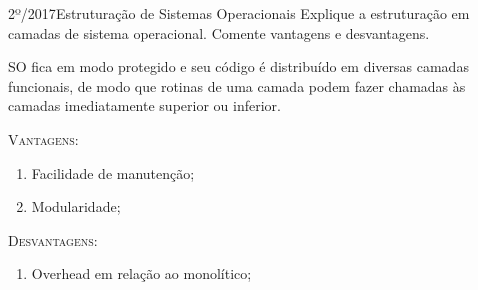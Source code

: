 \begin{exercicio}
  {2º/2017}{Estruturação de Sistemas Operacionais}
  {Explique a estruturação em camadas de sistema operacional. Comente vantagens e desvantagens.}

SO fica em modo protegido e seu código é distribuído em diversas camadas funcionais, de modo que rotinas de uma camada podem fazer chamadas às camadas imediatamente superior ou inferior.

 \textsc{Vantagens}:
  \begin{enumerate}
    \item Facilidade de manutenção;

    \item Modularidade;
  \end{enumerate}

 \textsc{Desvantagens}:
  \begin{enumerate}
    \item Overhead em relação ao monolítico;
  \end{enumerate}

\end{exercicio}

